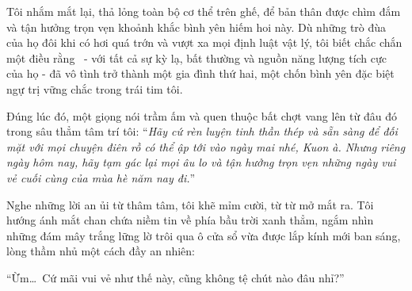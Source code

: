 \documentclass[../main.tex]{subfiles}
\begin{document}
Tôi nhắm mắt lại, thả lỏng toàn bộ cơ thể trên ghế, để bản thân được chìm đắm và tận hưởng trọn vẹn khoảnh khắc bình yên hiếm hoi này. Dù những trò đùa của họ đôi khi có hơi quá trớn và vượt xa mọi định luật vật lý, tôi biết chắc chắn một điều rằng \hll\ - với tất cả sự kỳ lạ, bất thường và nguồn năng lượng tích cực của họ - đã vô tình trở thành một gia đình thứ hai, một chốn bình yên đặc biệt ngự trị vững chắc trong trái tim tôi.

Đúng lúc đó, một giọng nói trầm ấm và quen thuộc bất chợt vang lên từ đâu đó trong sâu thẳm tâm trí tôi:
``\textit{Hãy cứ rèn luyện tinh thần thép và sẵn sàng để đối mặt với mọi chuyện điên rồ có thể ập tới vào ngày mai nhé, Kuon à. Nhưng riêng ngày hôm nay, hãy tạm gác lại mọi âu lo và tận hưởng trọn vẹn những ngày vui vẻ cuối cùng của mùa hè năm nay đi.}''

Nghe những lời an ủi từ thâm tâm, tôi khẽ mỉm cười, từ từ mở mắt ra. Tôi hướng ánh mắt chan chứa niềm tin về phía bầu trời xanh thẳm, ngắm nhìn những đám mây trắng lững lờ trôi qua ô cửa sổ vừa được lắp kính mới ban sáng, lòng thầm nhủ một cách đầy an nhiên:

\begin{center}
  ``Ừm\dots\ Cứ mãi vui vẻ như thế này, cũng không tệ chút nào đâu nhỉ?''
\end{center}
\end{document}

